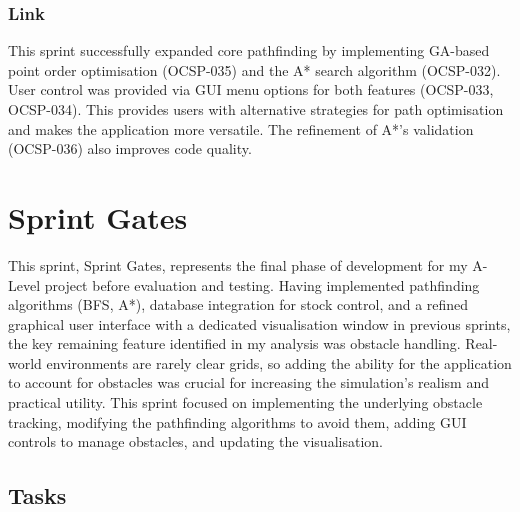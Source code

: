 \subsubsection{Link}
This sprint successfully expanded core pathfinding by implementing GA-based point order optimisation (OCSP-035) and the A* search algorithm (OCSP-032). User control was provided via GUI menu options for both features (OCSP-033, OCSP-034). This provides users with alternative strategies for path optimisation and makes the application more versatile. The refinement of A*'s validation (OCSP-036) also improves code quality.



\newpage


\section{Sprint Gates}

This sprint, Sprint Gates, represents the final phase of development for my A-Level project before evaluation and testing. Having implemented pathfinding algorithms (BFS, A*), database integration for stock control, and a refined graphical user interface with a dedicated visualisation window in previous sprints, the key remaining feature identified in my analysis was obstacle handling. Real-world environments are rarely clear grids, so adding the ability for the application to account for obstacles was crucial for increasing the simulation's realism and practical utility. This sprint focused on implementing the underlying obstacle tracking, modifying the pathfinding algorithms to avoid them, adding GUI controls to manage obstacles, and updating the visualisation.

\subsection{Tasks}

